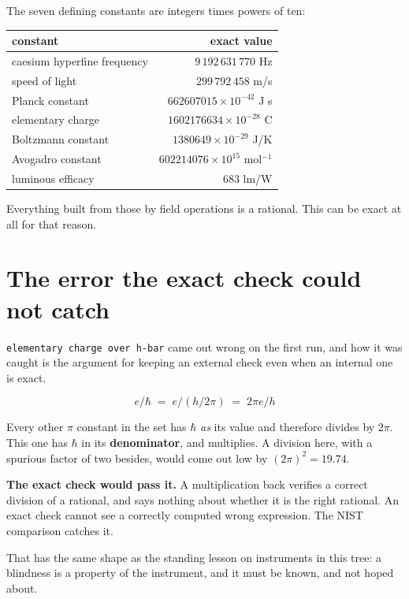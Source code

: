The seven defining constants are integers times powers of ten:

\begin{center}
\begin{tabular}{lr}
\toprule
constant & exact value \\
\midrule
caesium hyperfine frequency & \(9\,192\,631\,770\) Hz \\
speed of light & \(299\,792\,458\) m/s \\
Planck constant & \(662607015 \times 10^{-42}\) J s \\
elementary charge & \(1602176634 \times 10^{-28}\) C \\
Boltzmann constant & \(1380649 \times 10^{-29}\) J/K \\
Avogadro constant & \(602214076 \times 10^{15}\) mol\(^{-1}\) \\
luminous efficacy & \(683\) lm/W \\
\bottomrule
\end{tabular}
\end{center}

Everything built from those by field operations is a rational. This can be
exact at all for that reason.

\section{The error the exact check could not catch}

\texttt{elementary charge over h-bar} came out wrong on the first run, and how it was caught is the
argument for keeping an external check even when an internal one is exact.

\[
  e/\hbar \;=\; e \big/ (h/2\pi) \;=\; 2\pi e / h
\]

Every other \(\pi\) constant in the set has \(\hbar\) \emph{as} its value and therefore divides by
\(2\pi\). This one has \(\hbar\) in its \textbf{denominator}, and multiplies. A division here,
with a spurious factor of two besides, would come out low by
\((2\pi)^2 = 19.74\).

\textbf{The exact check would pass it.} A multiplication back verifies a correct division of a rational,
and says nothing about whether it is the right rational. An exact check cannot see a correctly
computed wrong expression. The NIST comparison catches it.

That has the same shape as the standing lesson on instruments in this tree: a blindness is a property
of the instrument, and it must be known, and not hoped about.
